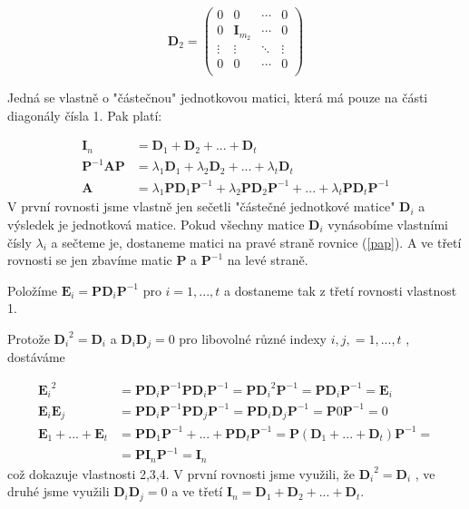 \begin{dukaz}
$$\textbf{D}_2 = \begin{pmatrix}
  0 & 0 & \cdots & 0 \\
  0 & \textbf{I}_{m_2} & \cdots & 0 \\
  \vdots & \vdots & \ddots & \vdots \\
  0 & 0 & \cdots & 0 \\
\end{pmatrix}$$

Jedná se vlastně o "částečnou" jednotkovou matici, která má pouze na části diagonály čísla 1. Pak platí:

\begin{equation*}
\begin{split}
\textbf{I}_n & = \textbf{D}_1 + \textbf{D}_2 + ... + \textbf{D}_t\\
\textbf{P}^{-1}\textbf{A}\textbf{P} & = \lambda_1 \textbf{D}_1 + \lambda_2 \textbf{D}_2 + ... + \lambda_t \textbf{D}_t\\
\textbf{A} & = \lambda_1\textbf{P}\textbf{D}_1\textbf{P}^{-1} + \lambda_2\textbf{P}\textbf{D}_2\textbf{P}^{-1} + ... + \lambda_t\textbf{P}\textbf{D}_t\textbf{P}^{-1}
\end{split}
\end{equation*}
V první rovnosti jsme vlastně jen sečetli "částečné jednotkové matice" $\textbf{D}_i$ a výsledek je jednotková matice. Pokud všechny matice $\textbf{D}_i$ vynásobíme vlastními čísly $\lambda_i$ a sečteme je, dostaneme matici na pravé straně rovnice (\ref{pap}). A ve třetí rovnosti se jen zbavíme matic $\textbf{P}$ a $\textbf{P}^{-1}$ na levé straně.

Položíme $\textbf{E}_i = \textbf{P}\textbf{D}_i\textbf{P}^{-1}$ pro $i=1,...,t$ a dostaneme tak z třetí rovnosti vlastnost 1.

Protože ${\textbf{D}_i}^2 = \textbf{D}_i$ a $\textbf{D}_i\textbf{D}_j = 0$ pro libovolné různé indexy $i,j,=1,...,t$ , dostáváme

\begin{equation*}
\begin{split}
{\textbf{E}_i}^2 & = \textbf{P}\textbf{D}_i\textbf{P}^{-1}\textbf{P}\textbf{D}_i\textbf{P}^{-1} = \textbf{P}{\textbf{D}_i}^2\textbf{P}^{-1} = \textbf{P}\textbf{D}_i\textbf{P}^{-1} = \textbf{E}_i\\
\textbf{E}_i\textbf{E}_j & = \textbf{P}\textbf{D}_i\textbf{P}^{-1}\textbf{P}\textbf{D}_j\textbf{P}^{-1} = \textbf{P}\textbf{D}_i\textbf{D}_j\textbf{P}^{-1} = \textbf{P}0\textbf{P}^{-1} = 0\\
\textbf{E}_1 + ... + \textbf{E}_t & = \textbf{P}\textbf{D}_1\textbf{P}^{-1} + ... + \textbf{P}\textbf{D}_t\textbf{P}^{-1} = \textbf{P}(\textbf{D}_1 + ... + \textbf{D}_t)\textbf{P}^{-1} =\\
& = \textbf{P}\textbf{I}_n\textbf{P}^{-1} = \textbf{I}_n
\end{split}
\end{equation*}
což dokazuje vlastnosti 2,3,4.
V první rovnosti jsme využili, že ${\textbf{D}_i}^2 = \textbf{D}_i$ ,  ve druhé jsme využili $\textbf{D}_i\textbf{D}_j = 0$ a ve třetí $\textbf{I}_n = \textbf{D}_1 + \textbf{D}_2 + ... + \textbf{D}_t$.


\end{dukaz}

